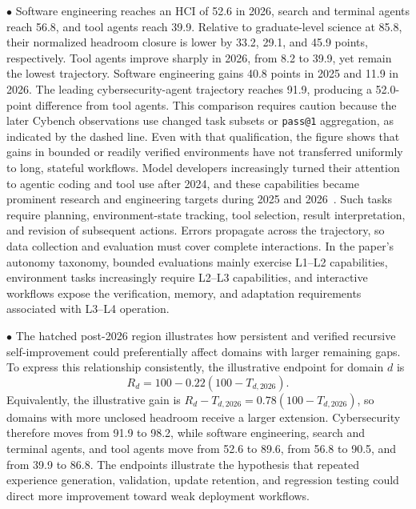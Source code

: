 \noindent$\bullet$ 
Software engineering reaches an HCI of 52.6 in 2026, search and terminal agents reach 56.8, and tool agents reach 39.9. Relative to graduate-level science at 85.8, their normalized headroom closure is lower by 33.2, 29.1, and 45.9 points, respectively. Tool agents improve sharply in 2026, from 8.2 to 39.9, yet remain the lowest trajectory. Software engineering gains 40.8 points in 2025 and 11.9 in 2026. The leading cybersecurity-agent trajectory reaches 91.9, producing a 52.0-point difference from tool agents. This comparison requires caution because the later Cybench observations use changed task subsets or \texttt{pass@1} aggregation, as indicated by the dashed line. Even with that qualification, the figure shows that gains in bounded or readily verified environments have not transferred uniformly to long, stateful workflows. Model developers increasingly turned their attention to agentic coding and tool use after 2024, and these capabilities became prominent research and engineering targets during 2025 and 2026~\cite{wang2026hgm,chen2026sweexp,sun2026seagent,li2026pando}. Such tasks require planning, environment-state tracking, tool selection, result interpretation, and revision of subsequent actions. Errors propagate across the trajectory, so data collection and evaluation must cover complete interactions. In the paper's autonomy taxonomy, bounded evaluations mainly exercise L1--L2 capabilities, environment tasks increasingly require L2--L3 capabilities, and interactive workflows expose the verification, memory, and adaptation requirements associated with L3--L4 operation.

\noindent$\bullet$ 
The hatched post-2026 region illustrates how persistent and verified recursive self-improvement could preferentially affect domains with larger remaining gaps. To express this relationship consistently, the illustrative endpoint for domain $d$ is
\begin{equation}
R_d=100-0.22\left(100-T_{d,2026}\right).
\end{equation}
Equivalently, the illustrative gain is $R_d-T_{d,2026}=0.78(100-T_{d,2026})$, so domains with more unclosed headroom receive a larger extension. Cybersecurity therefore moves from 91.9 to 98.2, while software engineering, search and terminal agents, and tool agents move from 52.6 to 89.6, from 56.8 to 90.5, and from 39.9 to 86.8. The endpoints illustrate the hypothesis that repeated experience generation, validation, update retention, and regression testing could direct more improvement toward weak deployment workflows.

